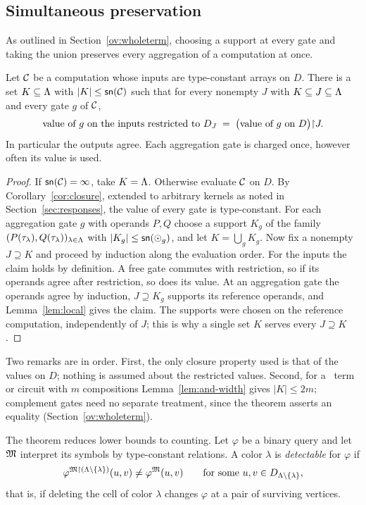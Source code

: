 \subsection{Simultaneous preservation}\label{sec:simultaneous}
As outlined in Section~\ref{ov:wholeterm}, choosing a support at every
gate and taking the union preserves every aggregation of a computation at
once.
\begin{theorem}[Preservation]\label{thm:preservation}
Let $\mathcal C$ be a computation whose inputs are type-constant arrays on $D$.
There is a set $K\subseteq\Lambda$ with $|K|\le\mathsf{sn}(\mathcal C)$ such that for
every nonempty $J$ with $K\subseteq J\subseteq\Lambda$ and every gate $g$ of
$\mathcal C$,
\[
 \text{value of $g$ on the inputs restricted to $D_J$}
 \;=\;
 \bigl(\text{value of $g$ on $D$}\bigr)\mathord{\restriction} J .
\]
In particular the outputs agree. Each aggregation gate is charged once,
however often its value is used.
\end{theorem}
\begin{proof}
If $\mathsf{sn}(\mathcal C)=\infty$, take $K=\Lambda$. Otherwise evaluate $\mathcal C$ on
$D$. By Corollary~\ref{cor:closure}, extended to arbitrary kernels as noted
in Section~\ref{sec:responses}, the value of every gate is type-constant.
For each aggregation gate $g$ with operands $P,Q$ choose a support $K_g$ of
the family $(P(\tau_{\lambda}),Q(\tau_{\lambda}))_{\lambda\in\Lambda}$ with
$|K_g|\le\mathsf{sn}(\odot_g)$, and let $K=\bigcup_gK_g$. Now fix a nonempty
$J\supseteq K$ and proceed by induction along the evaluation order. For the
inputs the claim holds by definition. A free gate commutes with
restriction, so if its operands agree after restriction, so does its value.
At an aggregation gate the operands agree by induction, $J\supseteq K_g$
supports its reference operands, and Lemma~\ref{lem:local} gives the claim.
The supports were chosen on the reference computation, independently of
$J$; this is why a single set $K$ serves every $J\supseteq K$.
\end{proof}
Two remarks are in order. First, the only closure property used is that of the values on
$D$; nothing is assumed about the restricted values. Second, for a \CoR\
term or circuit with $m$ compositions Lemma~\ref{lem:and-width} gives
$|K|\le2m$; complement gates need no separate treatment, since the theorem
asserts an equality (Section~\ref{ov:wholeterm}).

The theorem reduces lower bounds to counting. Let $\varphi$ be a binary
query and let $\mathfrak M$ interpret its symbols by type-constant relations. A color
$\lambda$ is \emph{detectable} for $\varphi$ if
\[
 \varphi^{\mathfrak M\mathord{\restriction}(\Lambda\setminus\{\lambda\})}(u,v)\ne\varphi^{\mathfrak M}(u,v)
 \qquad\text{for some }u,v\in D_{\Lambda\setminus\{\lambda\}},
\]
that is, if deleting the cell of color $\lambda$ changes $\varphi$ at a pair
of surviving vertices.

